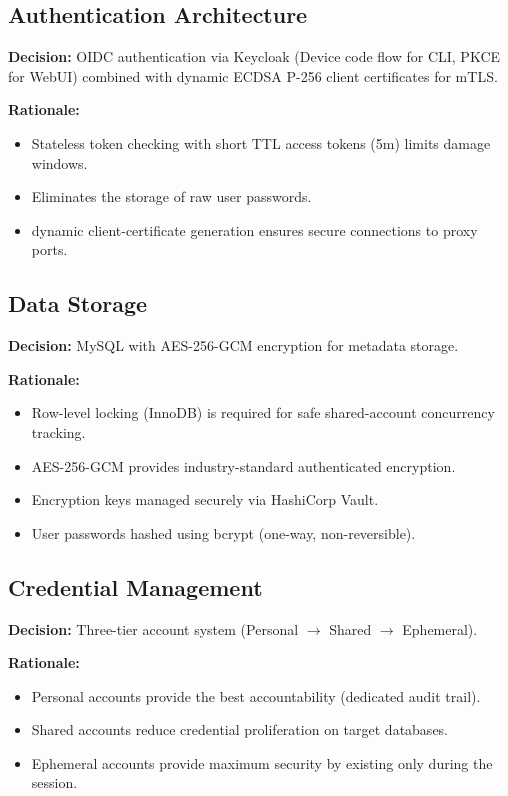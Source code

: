 \subsection{Authentication Architecture}

\textbf{Decision:} OIDC authentication via Keycloak (Device code flow for CLI, PKCE for WebUI) combined with dynamic ECDSA P-256 client certificates for mTLS.

\textbf{Rationale:}
\begin{itemize}
    \item Stateless token checking with short TTL access tokens (5m) limits damage windows.
    \item Eliminates the storage of raw user passwords.
    \item dynamic client-certificate generation ensures secure connections to proxy ports.
\end{itemize}

\subsection{Data Storage}

\textbf{Decision:} MySQL with AES-256-GCM encryption for metadata storage.

\textbf{Rationale:}
\begin{itemize}
    \item Row-level locking (InnoDB) is required for safe shared-account concurrency tracking.
    \item AES-256-GCM provides industry-standard authenticated encryption.
    \item Encryption keys managed securely via HashiCorp Vault.
    \item User passwords hashed using bcrypt (one-way, non-reversible).
\end{itemize}

\subsection{Credential Management}

\textbf{Decision:} Three-tier account system (Personal $\rightarrow$ Shared $\rightarrow$ Ephemeral).

\textbf{Rationale:}
\begin{itemize}
    \item Personal accounts provide the best accountability (dedicated audit trail).
    \item Shared accounts reduce credential proliferation on target databases.
    \item Ephemeral accounts provide maximum security by existing only during the session.
\end{itemize}

